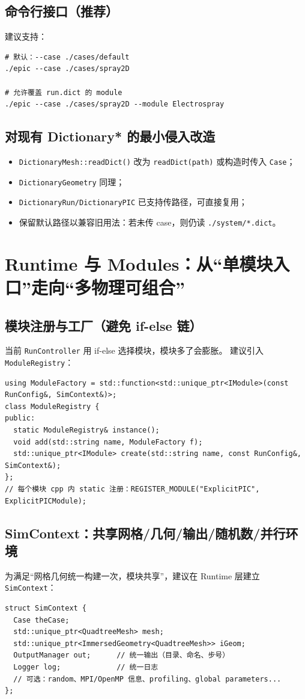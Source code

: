 \documentclass[UTF8,a4paper,11pt]{ctexart}
\begin{document}
\subsection{命令行接口（推荐）}
建议支持：
\begin{lstlisting}
# 默认：--case ./cases/default
./epic --case ./cases/spray2D

# 允许覆盖 run.dict 的 module
./epic --case ./cases/spray2D --module Electrospray
\end{lstlisting}

\subsection{对现有 Dictionary* 的最小侵入改造}
\begin{itemize}
  \item \texttt{DictionaryMesh::readDict()} 改为 \texttt{readDict(path)} 或构造时传入 \texttt{Case}；
  \item \texttt{DictionaryGeometry} 同理；
  \item \texttt{DictionaryRun/DictionaryPIC} 已支持传路径，可直接复用；
  \item 保留默认路径以兼容旧用法：若未传 case，则仍读 \texttt{./system/*.dict}。
\end{itemize}

\section{Runtime 与 Modules：从“单模块入口”走向“多物理可组合”}

\subsection{模块注册与工厂（避免 if-else 链）}
当前 \texttt{RunController} 用 if-else 选择模块，模块多了会膨胀。
建议引入 \texttt{ModuleRegistry}：
\begin{lstlisting}
using ModuleFactory = std::function<std::unique_ptr<IModule>(const RunConfig&, SimContext&)>;
class ModuleRegistry {
public:
  static ModuleRegistry& instance();
  void add(std::string name, ModuleFactory f);
  std::unique_ptr<IModule> create(std::string name, const RunConfig&, SimContext&);
};
// 每个模块 cpp 内 static 注册：REGISTER_MODULE("ExplicitPIC", ExplicitPICModule);
\end{lstlisting}

\subsection{SimContext：共享网格/几何/输出/随机数/并行环境}
为满足“网格几何统一构建一次，模块共享”，建议在 Runtime 层建立 \texttt{SimContext}：
\begin{lstlisting}
struct SimContext {
  Case theCase;
  std::unique_ptr<QuadtreeMesh> mesh;
  std::unique_ptr<ImmersedGeometry<QuadtreeMesh>> iGeom;
  OutputManager out;      // 统一输出（目录、命名、步号）
  Logger log;             // 统一日志
  // 可选：random、MPI/OpenMP 信息、profiling、global parameters...
};
\end{lstlisting}
\end{document}

